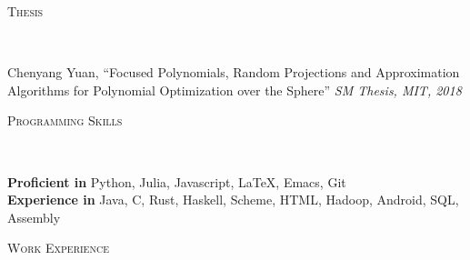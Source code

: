 \documentclass[9pt]{article}
\newenvironment{changemargin}[2]{%
  \begin{list}{}{%
      \setlength{\topsep}{0pt}%
      \setlength{\leftmargin}{#1}%
      \setlength{\rightmargin}{#2}%
      \setlength{\listparindent}{\parindent}%
      \setlength{\itemindent}{\parindent}%
      \setlength{\parsep}{\parskip}%
    }%
  \item[]}{\end{list}
}
\newcommand{\lineover}{
  \begin{changemargin}{-0.05in}{-0.05in}
    \vspace*{-8pt}
    \hrulefill \\
    \vspace*{-2pt}
  \end{changemargin}
}
\newcommand{\header}[1]{
  \begin{changemargin}{-0.5in}{-0.5in}
    \scshape{#1}\\
    \lineover
  \end{changemargin}
}
\newenvironment{body} {
  \vspace*{-16pt}
  \begin{changemargin}{-0.25in}{-0.5in}
  }
  {\end{changemargin}
}
\begin{document}
\header{Thesis}

\begin{body}
  \vspace{14pt}
  Chenyang Yuan, ``Focused Polynomials, Random Projections and Approximation Algorithms for
  Polynomial Optimization over the Sphere'' \emph{SM Thesis, MIT, 2018}
\end{body}

\header{Programming Skills}

\begin{body}
  \vspace{14pt}
  \textbf{Proficient in} Python, Julia, Javascript, \LaTeX, Emacs, Git\\
  \textbf{Experience in} Java, C, Rust, Haskell, Scheme, HTML, Hadoop, Android, SQL, Assembly
\end{body}

\smallskip



\header{Work Experience}
\end{document}

